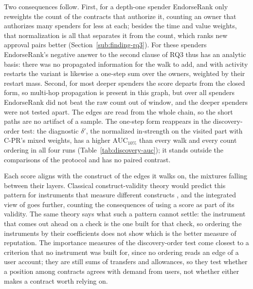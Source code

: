 Two consequences follow. First, for a depth-one spender EndorseRank only reweights the count of the contracts that authorize it, counting an owner that authorizes many spenders for less at each; besides the time and value weights, that normalization is all that separates it from the count, which ranks new approval pairs better (Section~\ref{sub:finding-rq3}). For these spenders EndorseRank's negative answer to the second clause of RQ3 thus has an analytic basis: there was no propagated information for the walk to add, and with activity restarts the variant is likewise a one-step sum over the owners, weighted by their restart mass. Second, for most deeper spenders the score departs from the closed form, so multi-hop propagation is present in this graph, but over all spenders EndorseRank did not beat the raw count out of window, and the deeper spenders were not tested apart. The edges are read from the whole chain, so the short paths are no artifact of a sample. The one-step form reappears in the discovery-order test: the diagnostic $\delta'$, the normalized in-strength on the visited part with \mbox{C-PR}'s mixed weights, has a higher $\mathrm{AUC}_{10\%}$ than every walk and every count ordering in all four runs (Table~\ref{tab:discovery-auc}); it stands outside the comparisons of the protocol and has no paired contrast.


Each score aligns with the construct of the edges it walks on, the mixtures falling between their layers. Classical construct-validity theory would predict this pattern for instruments that measure different constructs \parencite{cronbach1955construct}, and the integrated view of \textcite{messick1995validity} goes further, counting the consequences of using a score as part of its validity. The same theory says what such a pattern cannot settle: the instrument that comes out ahead on a check is the one built for that check, so ordering the instruments by their coefficients does not show which is the better measure of reputation. The importance measures of the discovery-order test come closest to a criterion that no instrument was built for, since no ordering reads an edge of a user account; they are still sums of transfers and allowances, so they test whether a position among contracts agrees with demand from users, not whether either makes a contract worth relying on.



